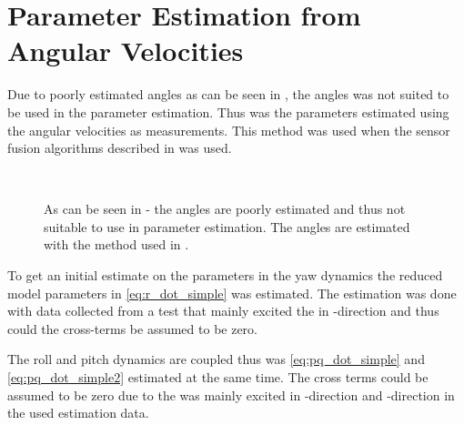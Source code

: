 \section{Parameter Estimation from Angular Velocities}
Due to poorly estimated angles as can be seen in , the angles was not suited to be used in the parameter estimation. Thus was the parameters estimated using the angular velocities as measurements. This method was used when the sensor fusion algorithms described in  was used.

\begin{figure}[tbp]
  \centering
  \qquad
  \\
  \caption{\label{fig:integratedAngleVelocities}%
    As can be seen in \protect{}-\protect{} the angles are poorly estimated and thus not suitable to use in parameter estimation. The angles are estimated with the method used in .}
\end{figure}

To get an initial estimate on the parameters in the yaw dynamics the reduced model parameters in \eqref{eq:r_dot_simple}
was estimated. The estimation was done with data collected from a test that mainly excited the \abbrROV in \yawAngle-direction and thus could the cross-terms be assumed to be zero.

The roll and pitch dynamics are coupled thus was \eqref{eq:pq_dot_simple} and \eqref{eq:pq_dot_simple2} estimated at the same time.
The cross terms could be assumed to be zero due to the \abbrROV was mainly excited in \rollAngle-direction and \pitchAngle-direction in the used estimation data.

